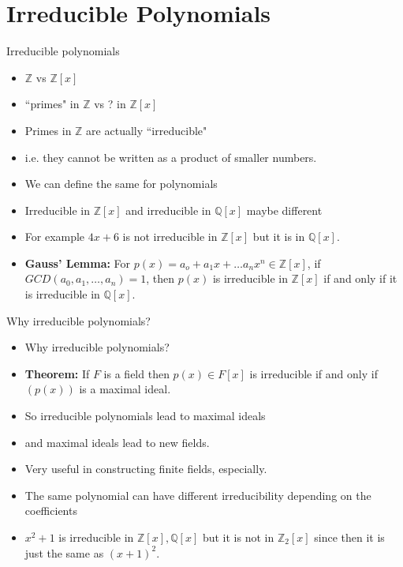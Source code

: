 \documentclass[ %
 10pt, xcolor={dvipsnames,svgnames,x11names,hyperref},
   hyperref={colorlinks=true,citecolor=green,linkcolor=DarkRed,urlcolor=ProcessBlue,anchorcolor=blue}
  ]{beamer}
\newenvironment{stepitemize}{\begin{itemize}[<+->]}{\end{itemize} }
\newcommand{\Z}{\mathbb{Z}}
\newcommand{\Q}{\mathbb{Q}}
\begin{document}
\section{Irreducible Polynomials}
\begin{frame}{Irreducible polynomials}
\begin{stepitemize}
\item $\Z$ vs $\Z[x]$
\item ``primes" in $\Z$ vs ? in $\Z[x]$ 
\item Primes in $\Z$ are actually ``irreducible"
\item i.e. they cannot be written as a product of smaller numbers.
\item We can define the same for polynomials
\item Irreducible in $\Z[x]$ and irreducible in $\Q[x]$ maybe different
\item For example $4x+6$ is not irreducible in $\Z[x]$ but it is in $\Q[x]$. 
\item {\bf Gauss' Lemma:} For $p(x)=a_o+a_1x+\dots a_nx^n \in \Z[x]$, if 
$GCD(a_0, a_1, \dots, a_n)=1$, then $p(x)$ is irreducible in $\Z[x]$ if and only if it is irreducible in $\Q[x]$. 
\end{stepitemize}
\end{frame}

\begin{frame}{Why irreducible polynomials?}
\begin{stepitemize}
    \item Why irreducible polynomials?
    \item {\bf Theorem:} If $F$ is a field then $p(x)\in F[x]$ is irreducible if and only if $(p(x))$ is a maximal ideal. \item So irreducible polynomials lead to maximal ideals
    \item and maximal ideals lead to new fields. 
    \item Very useful in constructing finite fields, especially.
    \item The same polynomial can have different irreducibility depending on the coefficients
    \item $x^2+1$ is irreducible in $\Z[x], \Q[x]$ but it is not in $\Z_2[x]$ since then it is just the same as $(x+1)^2$. 
\end{stepitemize}
\end{frame}
\end{document}
